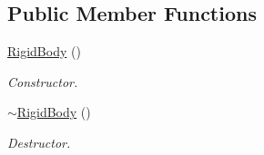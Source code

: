 \subsection*{Public Member Functions}
\begin{DoxyCompactItemize}
\item 
\hypertarget{classContent_1_1Actor_1_1Physics_1_1PhysX_1_1RigidBody_a5ef73a88fa6b984c9df98e2095697203}{
\hyperlink{classContent_1_1Actor_1_1Physics_1_1PhysX_1_1RigidBody_a5ef73a88fa6b984c9df98e2095697203}{RigidBody} ()}
\label{classContent_1_1Actor_1_1Physics_1_1PhysX_1_1RigidBody_a5ef73a88fa6b984c9df98e2095697203}

\begin{DoxyCompactList}\small\item\em Constructor. \item\end{DoxyCompactList}\item 
\hypertarget{classContent_1_1Actor_1_1Physics_1_1PhysX_1_1RigidBody_ac264d5ddd023e3ab44b78122a913ae14}{
\hyperlink{classContent_1_1Actor_1_1Physics_1_1PhysX_1_1RigidBody_ac264d5ddd023e3ab44b78122a913ae14}{$\sim$RigidBody} ()}
\label{classContent_1_1Actor_1_1Physics_1_1PhysX_1_1RigidBody_ac264d5ddd023e3ab44b78122a913ae14}

\begin{DoxyCompactList}\small\item\em Destructor. \item\end{DoxyCompactList}\end{DoxyCompactItemize}
